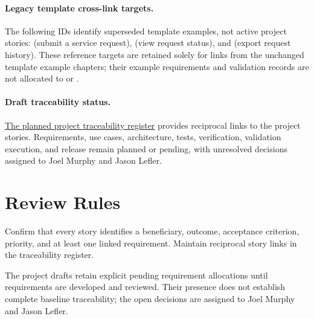 \paragraph{Legacy template cross-link targets.}
The following IDs identify superseded template examples, not active project
stories:  (submit a service request),
 (view request status), and
 (export request history). These reference targets are
retained solely for links from the unchanged template example chapters;
their example requirements and validation records are not allocated to
 or .

\paragraph{Draft traceability status.}
\hyperref[Section:DraftStoryTraceability]{The planned project traceability register}
provides reciprocal links to the project stories. Requirements, use cases,
architecture, tests, verification, validation execution, and release remain
planned or pending, with unresolved decisions assigned to Joel Murphy and Jason Lefler.

\section{Review Rules}
Confirm that every story identifies a beneficiary, outcome, acceptance
criterion, priority, and at least one linked requirement. Maintain reciprocal
story links in the traceability register.

The project drafts retain explicit pending requirement allocations until
requirements are developed and reviewed. Their presence does not establish
complete baseline traceability; the open decisions are assigned to Joel Murphy and Jason Lefler.
